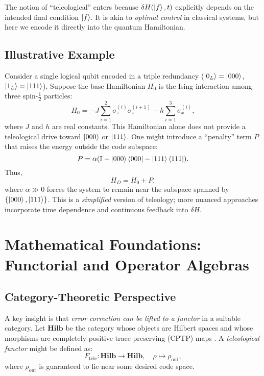 \documentclass[11pt]{article}
\begin{document}
The notion of ``teleological'' enters because $\delta H(\ket{f}, t)$ explicitly depends on the intended final condition $\ket{f}$. It is akin to \emph{optimal control} in classical systems, but here we encode it directly into the quantum Hamiltonian.

\subsection{Illustrative Example}
Consider a single logical qubit encoded in a triple redundancy ($\ket{0_L} = \ket{000}$, $\ket{1_L} = \ket{111}$). Suppose the base Hamiltonian $H_0$ is the Ising interaction among three spin-$\frac{1}{2}$ particles:
\begin{equation}
H_0 = -J \sum_{i=1}^2 \sigma_z^{(i)} \sigma_z^{(i+1)} - h \sum_{i=1}^3 \sigma_x^{(i)},
\end{equation}
where $J$ and $h$ are real constants. This Hamiltonian alone does not provide a teleological drive toward $\ket{000}$ or $\ket{111}$. One might introduce a ``penalty'' term $P$ that raises the energy outside the code subspace:
\begin{equation}
P = \alpha(\mathbb{I} - \ket{000}\bra{000} - \ket{111}\bra{111}).
\end{equation}
Thus,
\begin{equation}
H_D = H_0 + P,
\end{equation}
where $\alpha \gg 0$ forces the system to remain near the subspace spanned by $\{\ket{000}, \ket{111}\}$. This is a \emph{simplified} version of teleology; more nuanced approaches incorporate time dependence and continuous feedback into $\delta H$.

\section{Mathematical Foundations: Functorial and Operator Algebras}
\subsection{Category-Theoretic Perspective}
A key insight is that \emph{error correction can be lifted to a functor} in a suitable category. Let $\mathbf{Hilb}$ be the category whose objects are Hilbert spaces and whose morphisms are completely positive trace-preserving (CPTP) maps \cite{Selinger}. A \emph{teleological functor} might be defined as:
\begin{equation}
F_{\mathrm{tele}}: \mathbf{Hilb} \to \mathbf{Hilb},
\quad
\rho \mapsto \rho_\mathrm{out},
\end{equation}
where $\rho_\mathrm{out}$ is guaranteed to lie near some desired code space. 
\end{document}

